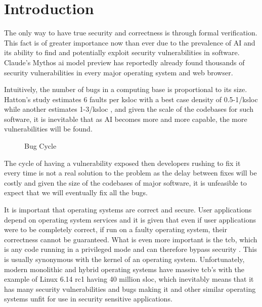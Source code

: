 \documentclass[../../thesis.tex]{subfiles}
\begin{document}
\section{Introduction}
    The only way to have true security and correctness is through formal verification. This fact is of greater importance now than ever due to the prevalence of AI and its ability to find and potentially exploit security vulnerabilities in software. Claude's Mythos \gls{ai} model preview has reportedly already found thousands of security vulnerabilities in every major operating system and web browser.
    
    Intuitively, the number of bugs in a computing base is proportional to its size. Hatton's study estimates 6 faults per k\gls{sloc} with a best case density of 0.5-1/k\gls{sloc} \citep{Hatton_97} while another estimates 1-3/k\gls{sloc} \citep{Mohagheghi_CKS_04}, and given the scale of the codebases for such software, it is inevitable that as AI becomes more and more capable, the more vulnerabilities will be found. 
    \begin{figure}[H]
        \centering
        \resizebox{\textwidth}{!}{
            
        }
        \caption{Bug Cycle}
        \label{Bug Cycle}
    \end{figure}
    The cycle of having a vulnerability exposed then developers rushing to fix it every time is not a real solution to the problem as the delay between fixes will be costly and given the size of the codebases of major software, it is unfeasible to expect that we will eventually fix all the bugs.

    It is important that operating systems are correct and secure. User applications depend on operating system services and it is given that even if user applications were to be completely correct, if run on a faulty operating system, their correctness cannot be guaranteed. What is even more important is the \gls{tcb}, which is any code running in a privileged mode and can therefore bypass security \citep{Rushby_81}. This is usually synonymous with the kernel of an operating system. Unfortunately, modern monolithic and hybrid operating systems have massive \gls{tcb}'s with the example of Linux 6.14 rc1 having 40 million \gls{sloc}, which inevitably means that it has many security vulnerabilities and bugs making it and other similar operating systems unfit for use in security sensitive applications.
\end{document}
